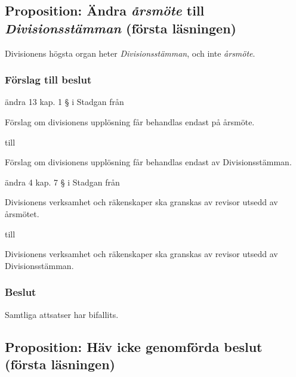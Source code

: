 \documentclass[protokoll]{dvd}
\begin{document}
\newpage
\subsection{Proposition: Ändra \emph{årsmöte} till \emph{Divisionsstämman} (första läsningen)}

Divisionens högsta organ heter \emph{Divisionsstämman}, och inte \emph{årsmöte}.

\subsubsection*{Förslag till beslut}

\begin{attsatser}
	\item ändra 13 kap. 1 § i Stadgan från

	\begin{displayquote}
        Förslag om divisionens upplösning får behandlas endast på årsmöte.
    \end{displayquote}

	till

	\begin{displayquote}
		Förslag om divisionens upplösning får behandlas endast av Divisionsstämman.
	\end{displayquote}

	\item ändra 4 kap. 7 § i Stadgan från

	\begin{displayquote}
        Divisionens verksamhet och räkenskaper ska granskas av revisor utsedd av årsmötet.
    \end{displayquote}

	till

	\begin{displayquote}
		Divisionens verksamhet och räkenskaper ska granskas av revisor utsedd av Divisionsstämman.
	\end{displayquote}
\end{attsatser}

\subsubsection{Beslut}
\begin{attsatser}
	\item Samtliga attsatser har bifallits.
\end{attsatser}


\newpage
\subsection{Proposition: Häv icke genomförda beslut (första läsningen)}
\end{document}
